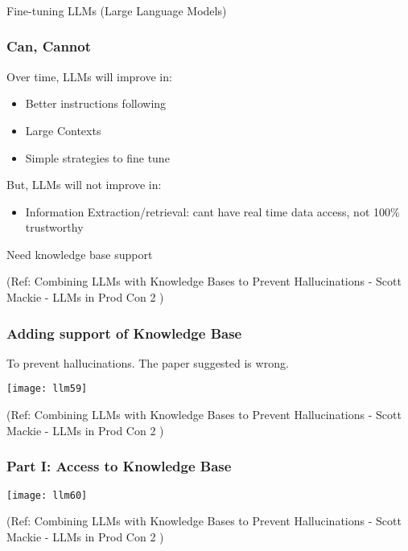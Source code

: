 \begin{frame}[fragile]\frametitle{}
\begin{center}
{\Large Fine-tuning LLMs (Large Language Models)}
\end{center}
\end{frame}

\begin{frame}[fragile]\frametitle{Can, Cannot}

Over time, LLMs will improve in:
\begin{itemize}
\item Better instructions following
\item Large Contexts
\item Simple strategies to fine tune
\end{itemize}	

But, LLMs will not improve in:
\begin{itemize}
\item Information Extraction/retrieval: cant have real time data access, not 100\% trustworthy
\end{itemize}

Need knowledge base support

{\tiny (Ref: Combining LLMs with Knowledge Bases to Prevent Hallucinations - Scott Mackie - LLMs in Prod Con 2 )}

\end{frame}

\begin{frame}[fragile]\frametitle{Adding support of Knowledge Base}

To prevent hallucinations. The paper suggested is wrong.


\begin{center}
\texttt{[image: llm59]}
\end{center}		


{\tiny (Ref: Combining LLMs with Knowledge Bases to Prevent Hallucinations - Scott Mackie - LLMs in Prod Con 2 )}

\end{frame}

\begin{frame}[fragile]\frametitle{Part I: Access to Knowledge Base}

\begin{center}
\texttt{[image: llm60]}
\end{center}		


{\tiny (Ref: Combining LLMs with Knowledge Bases to Prevent Hallucinations - Scott Mackie - LLMs in Prod Con 2 )}

\end{frame}

